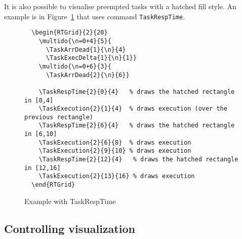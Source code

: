 \documentclass{article}
\begin{document}
It is also possible to visualise preempted tasks with a hatched fill
style. An example is in Figure~\ref{fig:resp-time} that uses command
\texttt{TaskRespTime}. 

\begin{figure}
  \centering
  \begin{RTGrid}{2}{20}
 
  \end{RTGrid}  
\begin{verbatim}
  \begin{RTGrid}{2}{20}
    \multido{\n=0+4}{5}{         
      \TaskArrDead{1}{\n}{4}    
      \TaskExecDelta{1}{\n}{1}}
    \multido{\n=0+6}{3}{        
      \TaskArrDead{2}{\n}{6}}

    \TaskRespTime{2}{0}{4}   % draws the hatched rectangle in [0,4]
    \TaskExecution{2}{1}{4}  % draws execution (over the previous rectangle)
    \TaskRespTime{2}{6}{4}   % draws the hatched rectangle in [6,10]
    \TaskExecution{2}{6}{8}  % draws execution
    \TaskExecution{2}{9}{10} % draws execution
    \TaskRespTime{2}{12}{4}   % draws the hatched rectangle in [12,16]
    \TaskExecution{2}{13}{16} % draws execution   
  \end{RTGrid}  
\end{verbatim}
  \caption{Example with TaskRespTime}
  \label{fig:resp-time}
\end{figure}


\subsection{Controlling visualization}
\end{document}
